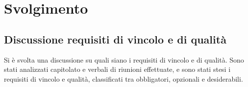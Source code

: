 \section{Svolgimento}

\subsection{Discussione requisiti di vincolo e di qualità}
Si è svolta una discussione su quali siano i requisiti di vincolo e di qualità. Sono stati analizzati capitolato e verbali di riunioni effettuate, e sono stati stesi i requisiti di vincolo e qualità, classificati tra obbligatori, opzionali e desiderabili.